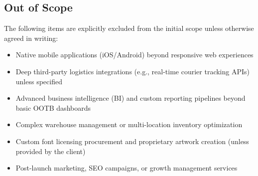 \subsection{Out of Scope}

The following items are explicitly excluded from the initial scope unless
otherwise agreed in writing:

\begin{itemize}[leftmargin=1.5em]
    \item Native mobile applications (iOS/Android) beyond responsive web experiences
    \item Deep third-party logistics integrations (e.g., real-time courier tracking APIs) unless specified
    \item Advanced business intelligence (BI) and custom reporting pipelines beyond basic OOTB dashboards
    \item Complex warehouse management or multi-location inventory optimization
    \item Custom font licensing procurement and proprietary artwork creation (unless provided by the client)
    \item Post-launch marketing, SEO campaigns, or growth management services
\end{itemize}
